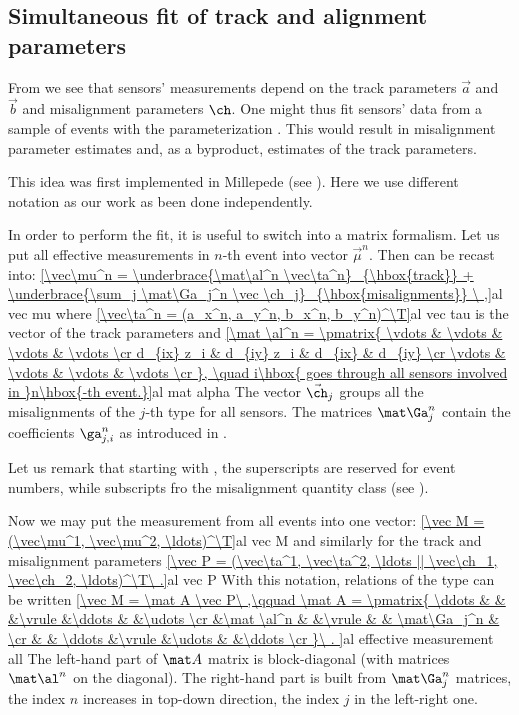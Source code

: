 \subsection[al sim fit]{Simultaneous fit of track and alignment parameters}

From  we see that sensors' measurements depend on the track parameters $\vec a$ and $\vec b$ and misalignment parameters $\ch$. One might thus fit sensors' data from a sample of events with the parameterization . This would result in misalignment parameter estimates and, as a byproduct, estimates of the track parameters.

This idea was first implemented in Millepede (see ). Here we use different notation as our work as been done independently.

In order to perform the fit, it is useful to switch into a matrix formalism. Let us put all effective measurements in $n$-th event into vector $\vec\mu^n$. Then  can be recast into:
\eqref{\vec\mu^n =
	\underbrace{\mat\al^n \vec\ta^n}_{\hbox{track}}
	+
	\underbrace{\sum_j \mat\Ga_j^n \vec \ch_j}_{\hbox{misalignments}}
\ ,}{al vec mu}
where
\eqref{\vec\ta^n = (a_x^n, a_y^n, b_x^n, b_y^n)^\T}{al vec tau}
is the vector of the track parameters and 
\eqref{\mat \al^n = \pmatrix{
	\vdots		& \vdots		& \vdots	& \vdots \cr
	d_{ix} z_i	& d_{iy} z_i	& d_{ix}	& d_{iy} \cr
	\vdots		& \vdots		& \vdots	& \vdots \cr
}, \quad i\hbox{ goes through all sensors involved in }n\hbox{-th event.}}{al mat alpha}
The vector $\vec\ch_j$ groups all the misalignments of the $j$-th type for all sensors. The matrices $\mat\Ga_j^n$ contain the coefficients $\ga^n_{j,i}$ as introduced in .

Let us remark that starting with , the superscripts are reserved for event numbers, while subscripts fro the misalignment quantity class (see ).

Now we may put the measurement from all events into one vector:
\eqref{\vec M = (\vec\mu^1, \vec\mu^2, \ldots)^\T}{al vec M}
and similarly for the track and misalignment parameters
\eqref{\vec P = (\vec\ta^1, \vec\ta^2, \ldots || \vec\ch_1, \vec\ch_2, \ldots)^\T\ .}{al vec P}
With this notation, relations of the type  can be written
\eqref{\vec M = \mat A \vec P\ ,\qquad
	\mat A = \pmatrix{
	\ddots & 		&		&\vrule	&\ddots	&				&\udots	\cr
		&\mat \al^n	&		&\vrule	&		& \mat\Ga_j^n	&	\cr
		&		& \ddots	&\vrule	&\udots	&				&\ddots	\cr
	}\ .
}{al effective measurement all}
The left-hand part of $\mat A$ matrix is block-diagonal (with matrices $\mat\al^n$ on the diagonal). The right-hand part is built from $\mat\Ga_j^n$ matrices, the index $n$ increases in top-down direction, the index $j$ in the left-right one.

